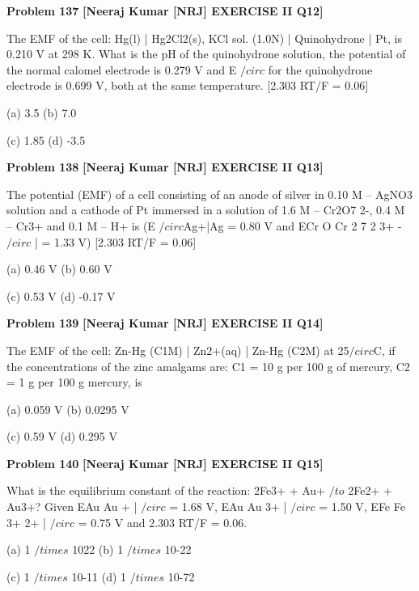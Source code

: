 \begin{problembox}
\textbf{Problem 137} \hfill \textbf{[Neeraj Kumar [NRJ] EXERCISE II Q12]}
\label{q:ext-nrj_all_questions-137}

The EMF of the cell: Hg(l) | Hg2Cl2(s), KCl sol. 
(1.0N) | Quinohydrone | Pt, is 0.210 V at 298 K. 
What is the pH of the quinohydrone solution, 
the potential of the normal calomel electrode is 
0.279 V and E $/circ$ for the quinohydrone electrode 
is 0.699 V, both at the same temperature. [2.303 
RT/F = 0.06]
 
 (a) 3.5 
(b) 7.0
 
 (c) 1.85 
(d) -3.5
\end{problembox}

\begin{problembox}
\textbf{Problem 138} \hfill \textbf{[Neeraj Kumar [NRJ] EXERCISE II Q13]}
\label{q:ext-nrj_all_questions-138}

The potential (EMF) of a cell consisting of an anode 
of silver in 0.10 M -- AgNO3 solution and a cathode 
of Pt immersed in a solution of 1.6 M -- Cr2O7
2-, 
0.4 M -- Cr3+ and 0.1 M -- H+ is (E $/circ$Ag+|Ag = 0.80 V 
and ECr O
Cr
2
7
2
3+
-
$/circ$
|
 = 1.33 V) [2.303 RT/F = 0.06]
 
 (a) 0.46 V 
(b) 0.60 V
 
 (c) 0.53 V 
(d) -0.17 V
\end{problembox}

\begin{problembox}
\textbf{Problem 139} \hfill \textbf{[Neeraj Kumar [NRJ] EXERCISE II Q14]}
\label{q:ext-nrj_all_questions-139}

The EMF of the cell: Zn-Hg (C1M) | Zn2+(aq) | 
Zn-Hg (C2M) at 25$/circ$C, if the concentrations of 
the zinc amalgams are: C1 = 10 g per 100 g of 
mercury, C2 = 1 g per 100 g mercury, is
 
 (a) 0.059 V 
(b) 0.0295 V
 
 (c) 0.59 V 
(d) 0.295 V
\end{problembox}

\begin{problembox}
\textbf{Problem 140} \hfill \textbf{[Neeraj Kumar [NRJ] EXERCISE II Q15]}
\label{q:ext-nrj_all_questions-140}

What is the equilibrium constant of the reaction: 
2Fe3+ + Au+ $/to$ 2Fe2+ + Au3+? Given EAu
Au
+ |
$/circ$
 = 1.68 
V, EAu
Au
3+ |
$/circ$
 = 1.50 V, EFe
Fe
3+
2+
|
$/circ$
 = 0.75 V and 2.303 
RT/F = 0.06.
 
 (a) 1 $/times$ 1022 
(b) 1 $/times$ 10-22
 
 (c) 1 $/times$ 10-11 
(d) 1 $/times$ 10-72
\end{problembox}

